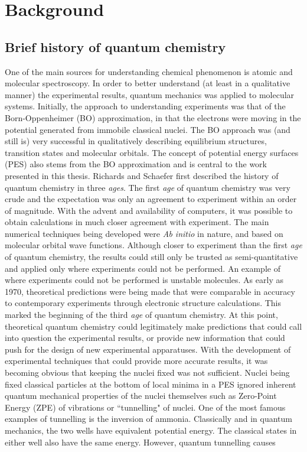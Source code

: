 \chapter{Background\label{ch:Background}}


\section{Brief history of quantum chemistry}
One of the main sources for understanding chemical phenomenon is atomic and molecular spectroscopy.  In order to better understand (at least in a qualitative manner) the experimental results, quantum mechanics was applied to molecular systems\cite{Csaszar2012}.  Initially, the approach to understanding experiments was that of the Born-Oppenheimer\cite{Born1927} (BO) approximation, in that the electrons were moving in the potential generated from immobile classical nuclei.  The BO approach was (and still is) very successful in qualitatively describing equilibrium structures, transition states and molecular orbitals.  The concept of potential energy surfaces (PES)\cite{Murrell1984} also stems from the BO approximation and is central to the work presented in this thesis.   Richards\cite{Richards1979} and Schaefer\cite{Schaefer1986} first described the history of quantum chemistry in three \emph{ages}.  The first \emph{age} of quantum chemistry was very crude and the expectation was only an agreement to experiment within an order of magnitude.  With the advent and availability of computers, it was possible to obtain calculations in much closer agreement with experiment.  The main numerical techniques being developed were \emph{Ab initio} in nature, and based on molecular orbital wave functions.  Although closer to experiment than the first \emph{age} of quantum chemistry, the results could still only be trusted as semi-quantitative and applied only where experiments could not be performed\cite{Richards1979}.  An example of where experiments could not be performed is unstable molecules.  As early as 1970\cite{Csaszar2012}, theoretical predictions were being made that were comparable in accuracy to contemporary experiments through electronic structure calculations.  This marked the beginning of the third \emph{age} of quantum chemistry.  At this point, theoretical quantum chemistry could legitimately make predictions that could call into question the experimental results, or provide new information that could push for the design of new experimental apparatuses.  With the development of experimental techniques that could provide more accurate results,  it was becoming obvious that keeping the nuclei fixed was not sufficient\cite{Csaszar2012}.  Nuclei being fixed classical particles at the bottom of local minima in a PES ignored inherent quantum mechanical properties of the nuclei themselves such as Zero-Point Energy (ZPE) of vibrations\cite{Czako2010} or ``tunnelling" of nuclei\cite{Bell1980}.  One of the most famous examples of tunnelling is the inversion of ammonia\cite{Dennison1932}.  Classically and in quantum mechanics, the two wells have equivalent potential energy.  The classical states in either well also have the same energy. However, quantum tunnelling causes 